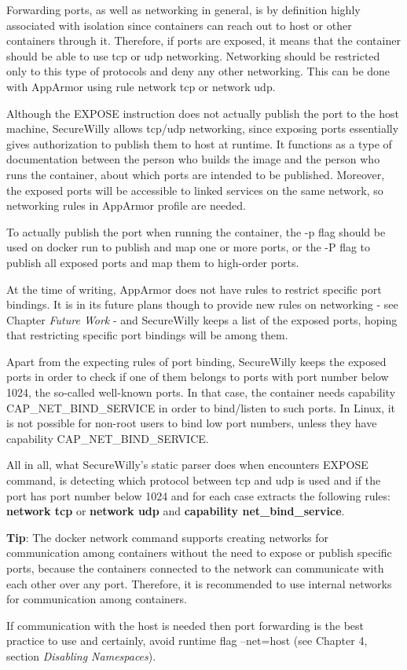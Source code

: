 Forwarding ports, as well as networking in general, is by definition highly associated with isolation since containers can reach out to host or other containers through it. Therefore, if ports are exposed, it means that the container should be able to use tcp or udp networking. Networking should be restricted only to this type of protocols and deny any other networking. This can be done with AppArmor using rule network tcp or network udp.

Although the EXPOSE instruction does not actually publish the port to the host machine, SecureWilly allows tcp/udp networking, since exposing ports essentially gives authorization to publish them to host at runtime. It functions as a type of documentation between the person who builds the image and the person who runs the container, about which ports are intended to be published. Moreover, the exposed ports will be accessible to linked services on the same network, so networking rules in AppArmor profile are needed.

To actually publish the port when running the container, the -p flag should be used on docker run to publish and map one or more ports, or the -P flag to publish all exposed ports and map them to high-order ports.

At the time of writing, AppArmor does not have rules to restrict specific port bindings. It is in its future plans though to provide new rules on networking - see Chapter \textit{Future Work} - and SecureWilly keeps a list of the exposed ports, hoping that restricting specific port bindings will be among them. 

Apart from the expecting rules of port binding, SecureWilly keeps the exposed ports in order to check if one of them belongs to ports with port number below 1024, the so-called well-known ports. In that case, the container needs capability CAP\_NET\_BIND\_SERVICE in order to bind/listen to such ports. In Linux, it is not possible for non-root users to bind low port numbers, unless they have capability CAP\_NET\_BIND\_SERVICE.

All in all, what SecureWilly's static parser does when encounters EXPOSE command, is detecting which protocol between tcp and udp is used and if the port has port number below 1024 and for each case extracts the following rules: \textbf{network tcp} or \textbf{network udp} and \textbf{capability net\_bind\_service}.

\begin{mdframed}[backgroundcolor=tipcolor]
\textbf{Tip}: The docker network command supports creating networks for communication among containers without the need to expose or publish specific ports, because the containers connected to the network can communicate with each other over any port. Therefore, it is recommended to use internal networks for communication among containers.

If communication with the host is needed then port forwarding is the best practice to use and certainly, avoid runtime flag --net=host (see Chapter 4, section \textit{Disabling Namespaces}).
\end{mdframed}

